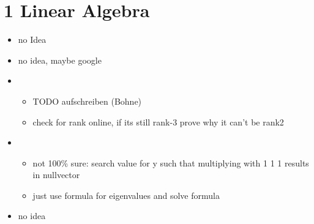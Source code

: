 \documentclass[12pt]{article}
\begin{document}

\section*{1 Linear Algebra}
\begin{itemize}
    \item 
        no Idea
        
    \item
        no idea, maybe google

    \item
        \begin{itemize}[(i)]
            \item 
                TODO aufschreiben (Bohne)
            \item
                check for rank online, if its still rank-3 prove why it can't be rank2
        \end{itemize}

    \item
        \begin{itemize}[(i)]
            \item 
                not 100\% sure: search value for y such that multiplying with 1 1 1 results in nullvector
            \item
                just use formula for eigenvalues and solve formula
        \end{itemize}

    \item
        no idea
\end{itemize}

\newpage
\end{document}
